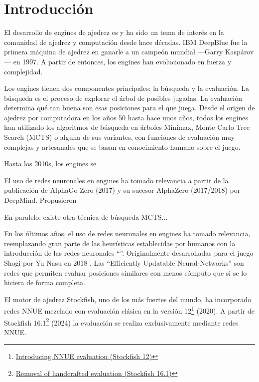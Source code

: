 \section*{Introducción}

El desarrollo de engines de ajedrez es y ha sido un tema de interés en la comunidad de ajedrez y computación desde hace décadas. IBM DeepBlue \cite{deepblue:2002} fue la primera máquina de ajedrez en ganarle a un campeón mundial ---Garry Kaspárov--- en 1997. A partir de entonces, los engines han evolucionado en fuerza y complejidad.

Los engines tienen dos componentes principales: la búsqueda y la evaluación. La búsqueda es el proceso de explorar el árbol de posibles jugadas. La evaluación determina qué tan buena son esas posiciones para el que juega. Desde el origen de ajedrez por computadora en los años 50 hasta hace unos años, todos los engines han utilizado los algoritmos de búsqueda en árboles Minimax, Monte Carlo Tree Search (MCTS) \cite{mcts-survey:2012} o alguna de sus variantes, con funciones de evaluación muy complejas y artesanales que se basan en conocimiento humano sobre el juego.


Hasta los 2010s, los engines se 

El uso de redes neuronales en engines ha tomado relevancia a partir de la publicación de AlphaGo Zero \cite{alphagozero:2017} (2017) y su sucesor AlphaZero \cite{alphazero:2017,alphazero:2018} (2017/2018) por DeepMind. Propusieron 


En paralelo, existe otra técnica de búsqueda MCTS...




En los últimos años, el uso de redes neuronales en engines ha tomado relevancia, reemplazando gran parte de las heurísticas establecidas por humanos con la introducción de las redes neuronales ``''. Originalmente desarrolladas para el juego Shogi por Yu Nasu en 2018 \cite{nnue:2018}. Las ``Efficiently Updatable Neural-Networks'' son redes que permiten evaluar posiciones similares con menos cómputo que si se lo hiciera de forma completa.

El motor de ajedrez Stockfish, uno de los más fuertes del mundo, ha incorporado redes NNUE mezclado con evaluación clásica en la versión 12\footnote[1]{\href{https://stockfishchess.org/blog/2020/introducing-nnue-evaluation/}{Introducing NNUE evaluation (Stockfish 12)}} (2020). A partir de Stockfish 16.1\footnote[2]{\href{https://stockfishchess.org/blog/2024/stockfish-16-1/}{Removal of handcrafted evaluation (Stockfish 16.1)}} (2024) la evaluación se realiza exclusivamente mediante redes NNUE.


